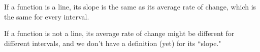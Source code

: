 \begin{frame}
If a function is a line, its slope is the same as its average rate of change, which is the same for every interval.\vfill

If a function is not a line, its average rate of change might be different for different intervals, and we don't have a definition (yet) for its ``slope."
%
%
%
\end{frame}
